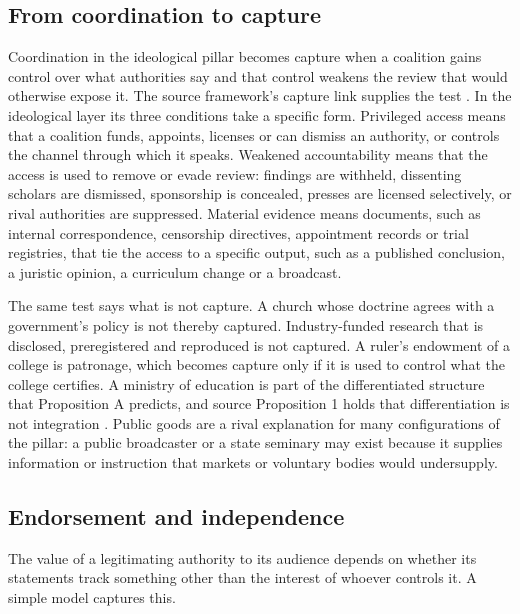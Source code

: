 \documentclass[11pt,letterpaper]{article}
\theoremstyle{definition}
\theoremstyle{remark}
\begin{document}
\subsection{From coordination to capture}

Coordination in the ideological pillar becomes capture when a coalition gains control over what authorities say and that control weakens the review that would otherwise expose it. The source framework's capture link supplies the test \citep{largo2026hbs}. In the ideological layer its three conditions take a specific form. Privileged access means that a coalition funds, appoints, licenses or can dismiss an authority, or controls the channel through which it speaks. Weakened accountability means that the access is used to remove or evade review: findings are withheld, dissenting scholars are dismissed, sponsorship is concealed, presses are licensed selectively, or rival authorities are suppressed. Material evidence means documents, such as internal correspondence, censorship directives, appointment records or trial registries, that tie the access to a specific output, such as a published conclusion, a juristic opinion, a curriculum change or a broadcast.

The same test says what is not capture. A church whose doctrine agrees with a government's policy is not thereby captured. Industry-funded research that is disclosed, preregistered and reproduced is not captured. A ruler's endowment of a college is patronage, which becomes capture only if it is used to control what the college certifies. A ministry of education is part of the differentiated structure that Proposition A predicts, and source Proposition 1 holds that differentiation is not integration \citep{largo2026hbs}. Public goods are a rival explanation for many configurations of the pillar: a public broadcaster or a state seminary may exist because it supplies information or instruction that markets or voluntary bodies would undersupply.

\subsection{Endorsement and independence}

The value of a legitimating authority to its audience depends on whether its statements track something other than the interest of whoever controls it. A simple model captures this.
\end{document}
